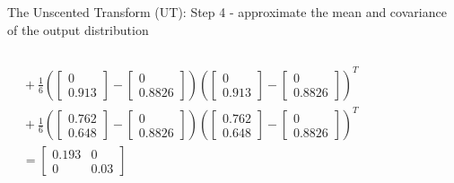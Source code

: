 \begin{frame}{The Unscented Transform (UT): Step 4 - approximate the mean and covariance of the output distribution}
\begin{columns}
\begin{align*}
& \!+\! \frac{1}{6}\!
\left(
\begin{bmatrix}
0 \\
0.913
\end{bmatrix}
-
\begin{bmatrix}
0 \\
0.8826
\end{bmatrix}
\right)\!\!
\left(\!
\begin{bmatrix}
0 \\
0.913
\end{bmatrix}
-
\begin{bmatrix}
0 \\
0.8826
\end{bmatrix}
\right)^T\\
& \!+\! \frac{1}{6}\!
\left(\!
\begin{bmatrix}
0.762 \\
0.648
\end{bmatrix}
\!-\!
\begin{bmatrix}
0 \\
0.8826
\end{bmatrix}
\right)\!\!
\left(\!
\begin{bmatrix}
0.762 \\
0.648
\end{bmatrix}
\!-\!
\begin{bmatrix}
0 \\
0.8826
\end{bmatrix}\!
\right)^T \\
& =
\begin{bmatrix}
0.193 & 0 \\
0 & 0.03
\end{bmatrix}   
\end{align*}
\end{columns}
\end{frame}


